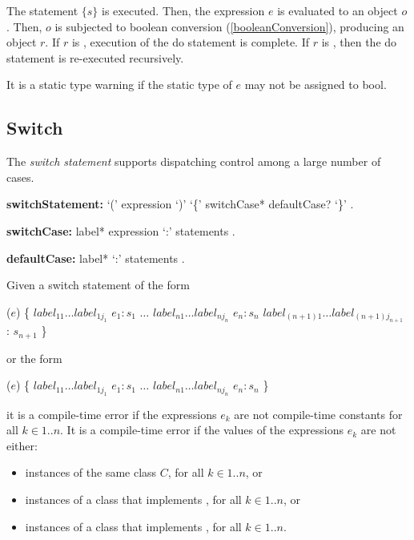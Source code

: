 \documentclass{article}
\newcommand{\code}[1]{{\sf #1}}
\begin{document}
\begin{itemize}
\LMHash{}
The statement $\{s\}$ is executed. Then, the expression $e$ is evaluated to an object $o$. Then, $o$ is  subjected to boolean conversion (\ref{booleanConversion}), producing an object $r$. If $r$ is \FALSE{}, execution of the do statement is complete. If $r$ is \TRUE{}, then the do statement is re-executed recursively.

\LMHash{}
It is a static type warning if the static type of $e$ may not be assigned to \code{bool}.

\subsection{Switch}

\LMHash{}
The {\em switch statement} supports dispatching control among a large number of cases.

 \begin{grammar}
{\bf switchStatement:}
      \SWITCH{} `(' expression `)' `\{' switchCase* defaultCase? `\}'%
    .


{\bf switchCase:}
      label* \CASE{} expression `{\escapegrammar :}' statements
    .

{\bf defaultCase:}
      label*  \DEFAULT{} `{\escapegrammar :}' statements
    .
 \end{grammar}

\LMHash{}
 Given a switch statement of the form

\begin{dartCode}
\SWITCH{} ($e$) \{
   $label_{11} \ldots label_{1j_1}$ \CASE{} $e_1: s_1$
   $\ldots$
   $label_{n1} \ldots label_{nj_n}$ \CASE{} $e_n: s_n$
   $label_{(n+1)1} \ldots label_{(n+1)j_{n+1}}$ \DEFAULT{}: $s_{n+1}$
\}
\end{dartCode}

 or the form

\begin{dartCode}
\SWITCH{} ($e$) \{
   $label_{11} \ldots label_{1j_1}$ \CASE{} $e_1: s_1$
   $\ldots$
   $label_{n1} \ldots label_{nj_n}$ \CASE{} $e_n: s_n$
\}
\end{dartCode}

 it is a compile-time error if the expressions $e_k$ are not compile-time constants for all  $k \in 1..n$.  It is a compile-time error if the values of the expressions $e_k$ are not either:
 \begin{itemize}
 \item instances of the same class $C$, for all $k \in 1..n$,  or
 \item instances of a class that implements , for all $k \in 1..n$,  or
 \item instances of a class that implements , for all $k \in 1..n$.
 \end{itemize}


\end{itemize}
\end{document}
